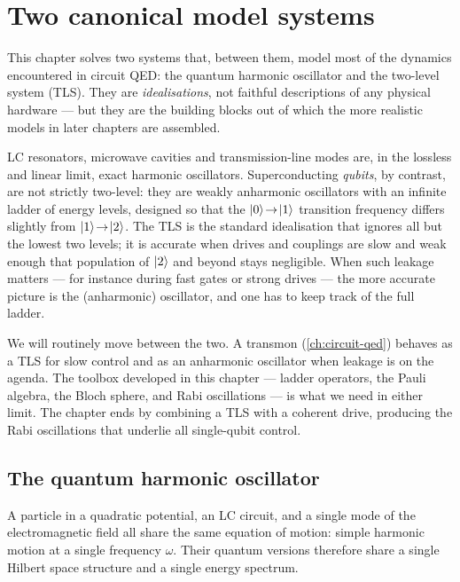 \chapter{Two canonical model systems}
\label{ch:model-systems}


This chapter solves two systems that, between them, model most of
the dynamics encountered in circuit QED: the quantum harmonic
oscillator and the two-level system (TLS). They are
\emph{idealisations}, not faithful descriptions of any physical
hardware --- but they are the building blocks out of which the more
realistic models in later chapters are assembled.

LC resonators, microwave cavities and transmission-line modes are,
in the lossless and linear limit, exact harmonic oscillators.
Superconducting \emph{qubits}, by contrast, are not strictly
two-level: they are weakly anharmonic oscillators with an infinite
ladder of energy levels, designed so that the
$\ket{0}\!\to\!\ket{1}$ transition frequency differs slightly from
$\ket{1}\!\to\!\ket{2}$. The TLS is the standard idealisation that
ignores all but the lowest two levels; it is accurate when drives
and couplings are slow and weak enough that population of $\ket{2}$
and beyond stays negligible. When such leakage matters --- for
instance during fast gates or strong drives --- the more accurate
picture is the (anharmonic) oscillator, and one has to keep track
of the full ladder.

We will routinely move between the two. A transmon (\cref{ch:circuit-qed})
behaves as a TLS for slow control and as an anharmonic oscillator
when leakage is on the agenda. The toolbox developed in this
chapter --- ladder operators, the Pauli algebra, the Bloch sphere,
and Rabi oscillations --- is what we need in either limit. The
chapter ends by combining a TLS with a coherent drive, producing
the Rabi oscillations that underlie all single-qubit control.

\section{The quantum harmonic oscillator}
\label{sec:qho}

\begin{phenomenon}
A particle in a quadratic potential, an LC circuit, and a single
mode of the electromagnetic field all share the same equation of
motion: simple harmonic motion at a single frequency $\omega$. Their
quantum versions therefore share a single Hilbert space structure
and a single energy spectrum.
\end{phenomenon}

